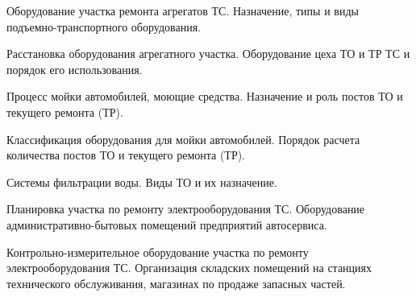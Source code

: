 \documentclass[
	14pt,
	a4paper,
	]
	{scrartcl}
\begin{document}
\newpage


\shapk
{}
\setcounter{zad}{0}

\vfill
\z Оборудование участка ремонта агрегатов ТС.
 \vfill
\z Назначение, типы и виды подъемно-транспортного оборудования.
 \vfill

\vfill

\newpage


\shapk
{}
\setcounter{zad}{0}

\vfill
\z Расстановка оборудования агрегатного участка.
 \vfill
\z Оборудование цеха ТО и ТР ТС и порядок его использования.
 \vfill

\vfill

\newpage


\shapk
{}
\setcounter{zad}{0}

\vfill
\z Процесс мойки автомобилей, моющие средства.
 \vfill
\z Назначение и роль постов ТО и текущего ремонта (ТР).
 \vfill

\vfill

\newpage


\shapk
{}
\setcounter{zad}{0}

\vfill
\z Классификация оборудования для мойки автомобилей.
 \vfill
\z Порядок расчета количества постов ТО и текущего ремонта (ТР).
 \vfill

\vfill

\newpage


\shapk
{}
\setcounter{zad}{0}

\vfill
\z Системы фильтрации воды.
 \vfill
\z Виды ТО и их назначение.
 \vfill

\vfill

\newpage


\shapk
{}
\setcounter{zad}{0}

\vfill
\z Планировка участка по ремонту электрооборудования ТС.
 \vfill
\z Оборудование административно-бытовых помещений предприятий автосервиса.
 \vfill

\vfill

\newpage


\shapk
{}
\setcounter{zad}{0}

\vfill
\z Контрольно-измерительное оборудование участка по ремонту электрооборудования ТС.
 \vfill
\z Организация складских помещений на станциях технического обслуживания, магазинах по продаже запасных частей.
 \vfill
\end{document}
